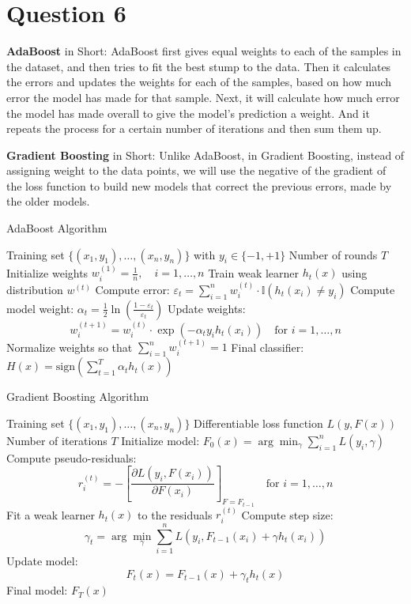 \documentclass[a4paper,12pt]{article}
\begin{document}
\section*{Question 6}

\noindent\textbf{AdaBoost} in Short: AdaBoost first gives equal weights to each of the samples in the dataset, and then tries to fit the best stump to the data. 
Then it calculates the errors and updates the weights for each of the samples, based on how much error the model has made for that sample. Next, 
it will calculate how much error the model has made overall to give the model's prediction a weight. And it repeats the process for a certain number of iterations and then sum them up.

\noindent\textbf{Gradient Boosting} in Short: Unlike AdaBoost, in Gradient Boosting, instead of assigning weight to the data points, we will use the negative of the gradient of the loss function to 
build new models that correct the previous errors, made by the older models. 

\begin{algorithm}
\caption{AdaBoost Algorithm}
\begin{algorithmic}[1]
\REQUIRE Training set $\{(x_1, y_1), \dots, (x_n, y_n)\}$ with $y_i \in \{-1, +1\}$
\REQUIRE Number of rounds $T$
\STATE Initialize weights $w_i^{(1)} = \frac{1}{n}, \quad i = 1, \dots, n$
    \STATE Train weak learner $h_t(x)$ using distribution $w^{(t)}$
    \STATE Compute error: $\varepsilon_t = \sum_{i=1}^n w_i^{(t)} \cdot \mathbb{I}(h_t(x_i) \ne y_i)$
    \STATE Compute model weight: $\alpha_t = \frac{1}{2} \ln\left(\frac{1 - \varepsilon_t}{\varepsilon_t}\right)$
    \STATE Update weights:
    \[
        w_i^{(t+1)} = w_i^{(t)} \cdot \exp(-\alpha_t y_i h_t(x_i)) \quad \text{for } i = 1, \dots, n
    \]
    \STATE Normalize weights so that $\sum_{i=1}^n w_i^{(t+1)} = 1$
\ENDFOR
\RETURN Final classifier: $H(x) = \text{sign} \left( \sum_{t=1}^T \alpha_t h_t(x) \right)$
\end{algorithmic}
\end{algorithm}

\begin{algorithm}
\caption{Gradient Boosting Algorithm}
\begin{algorithmic}[1]
\REQUIRE Training set $\{(x_1, y_1), \dots, (x_n, y_n)\}$
\REQUIRE Differentiable loss function $L(y, F(x))$
\REQUIRE Number of iterations $T$
\STATE Initialize model: $F_0(x) = \arg\min_{\gamma} \sum_{i=1}^n L(y_i, \gamma)$
    \STATE Compute pseudo-residuals:
    \[
        r_i^{(t)} = -\left[ \frac{\partial L(y_i, F(x_i))}{\partial F(x_i)} \right]_{F=F_{t-1}} \quad \text{for } i = 1, \dots, n
    \]
    \STATE Fit a weak learner $h_t(x)$ to the residuals $r_i^{(t)}$
    \STATE Compute step size:
    \[
        \gamma_t = \arg\min_{\gamma} \sum_{i=1}^n L(y_i, F_{t-1}(x_i) + \gamma h_t(x_i))
    \]
    \STATE Update model:
    \[
        F_t(x) = F_{t-1}(x) + \gamma_t h_t(x)
    \]
\ENDFOR
\RETURN Final model: $F_T(x)$
\end{algorithmic}
\end{algorithm}
\end{document}
